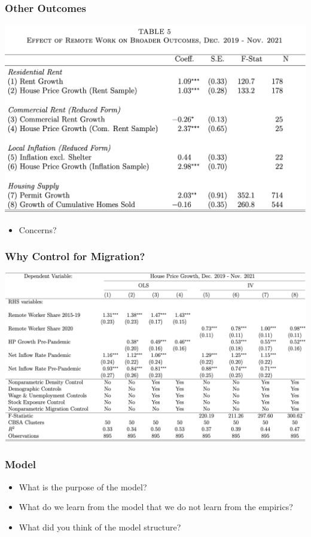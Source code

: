 \documentclass[english,xcolor=svgnames]{beamer}
\begin{document}
\begin{frame}
	\frametitle[alignment=center]{Other Outcomes}
	\begin{center}
		\includegraphics[scale=0.35]{figures/MWTAB5.png}
	\end{center}
	\begin{itemize}
		\item Concerns?
	\end{itemize}
\end{frame}

\begin{frame}
	\frametitle[alignment=center]{Why Control for Migration?}
	\begin{center}
		\includegraphics[scale=0.3]{figures/MWTAB6.png}
	\end{center}
\end{frame}

\begin{frame}
	\frametitle[alignment=center]{Model}
	\begin{itemize}
		\item What is the purpose of the model?
		\item What do we learn from the model that we do not learn from the empirics?
		\item What did you think of the model structure?
	\end{itemize}
\end{frame}
\end{document}
